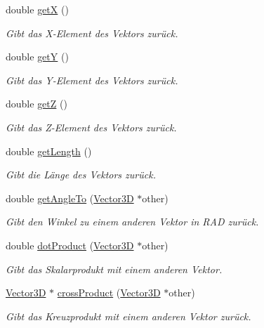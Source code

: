 \begin{DoxyCompactItemize}
double \hyperlink{classVector3D_aa9eaf29045bf32b95c5c7bcb2b8b68d7}{get\-X} ()
\begin{DoxyCompactList}\small\item\em Gibt das X-\/\-Element des Vektors zurück. \end{DoxyCompactList}\item 
double \hyperlink{classVector3D_aa3ffff17b886274a58417dfe4bb4c4a2}{get\-Y} ()
\begin{DoxyCompactList}\small\item\em Gibt das Y-\/\-Element des Vektors zurück. \end{DoxyCompactList}\item 
double \hyperlink{classVector3D_ab0dcbf253ff78856eccb5ea74d080fc7}{get\-Z} ()
\begin{DoxyCompactList}\small\item\em Gibt das Z-\/\-Element des Vektors zurück. \end{DoxyCompactList}\item 
double \hyperlink{classVector3D_a2e3aa1d244483abcb1a8e48e47e79512}{get\-Length} ()
\begin{DoxyCompactList}\small\item\em Gibt die Länge des Vektors zurück. \end{DoxyCompactList}\item 
double \hyperlink{classVector3D_a4bf1dcea68296f2f38f3574242933153}{get\-Angle\-To} (\hyperlink{classVector3D}{Vector3\-D} $\ast$other)
\begin{DoxyCompactList}\small\item\em Gibt den Winkel zu einem anderen Vektor in R\-A\-D zurück. \end{DoxyCompactList}\item 
double \hyperlink{classVector3D_a0808a8e6004a347d82f9214778b5968f}{dot\-Product} (\hyperlink{classVector3D}{Vector3\-D} $\ast$other)
\begin{DoxyCompactList}\small\item\em Gibt das Skalarprodukt mit einem anderen Vektor. \end{DoxyCompactList}\item 
\hyperlink{classVector3D}{Vector3\-D} $\ast$ \hyperlink{classVector3D_a482cd77ce44ea7dd71fd7a43cb7b1cf5}{cross\-Product} (\hyperlink{classVector3D}{Vector3\-D} $\ast$other)
\begin{DoxyCompactList}\small\item\em Gibt das Kreuzprodukt mit einem anderen Vektor zurück. \end{DoxyCompactList}\item 

\end{DoxyCompactItemize}
